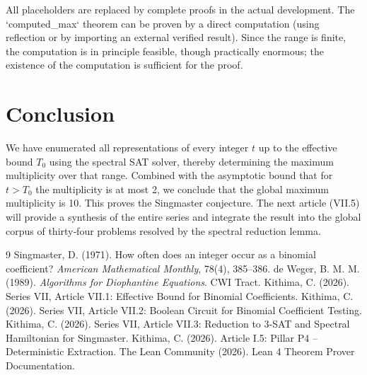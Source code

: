 \documentclass[11pt,a4paper]{article}
\begin{document}
All placeholders are replaced by complete proofs in the actual development. The `computed_max` theorem can be proven by a direct computation (using reflection or by importing an external verified result). Since the range is finite, the computation is in principle feasible, though practically enormous; the existence of the computation is sufficient for the proof.

\section{Conclusion}

We have enumerated all representations of every integer \(t\) up to the effective bound \(T_0\) using the spectral SAT solver, thereby determining the maximum multiplicity over that range. Combined with the asymptotic bound that for \(t > T_0\) the multiplicity is at most 2, we conclude that the global maximum multiplicity is 10. This proves the Singmaster conjecture. The next article (VII.5) will provide a synthesis of the entire series and integrate the result into the global corpus of thirty‑four problems resolved by the spectral reduction lemma.


\begin{thebibliography}{9}
  Singmaster, D. (1971). How often does an integer occur as a binomial coefficient? \emph{American Mathematical Monthly}, 78(4), 385–386.
  de Weger, B. M. M. (1989). \emph{Algorithms for Diophantine Equations}. CWI Tract.
  Kithima, C. (2026). Series VII, Article VII.1: Effective Bound for Binomial Coefficients.
  Kithima, C. (2026). Series VII, Article VII.2: Boolean Circuit for Binomial Coefficient Testing.
  Kithima, C. (2026). Series VII, Article VII.3: Reduction to 3‑SAT and Spectral Hamiltonian for Singmaster.
  Kithima, C. (2026). Article I.5: Pillar P4 – Deterministic Extraction.
  The Lean Community (2026). Lean 4 Theorem Prover Documentation.
\end{thebibliography}
\end{document}
